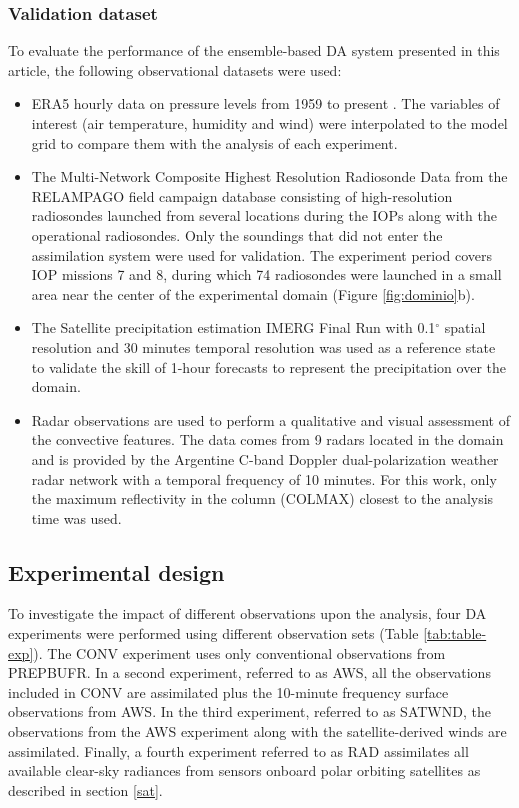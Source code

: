 \documentclass[final,5p,times,twocolumn,authoryear]{elsarticle} %
\begin{document}
\hypertarget{validation-dataset}{%
\subsubsection{Validation dataset}\label{validation-dataset}}

To evaluate the performance of the ensemble-based DA system presented in this article, the following observational datasets were used:

\begin{itemize}
\item
  ERA5 hourly data on pressure levels from 1959 to present \citep{era5pressure}. The variables of interest (air temperature, humidity and wind) were interpolated to the model grid to compare them with the analysis of each experiment.
\item
  The Multi-Network Composite Highest Resolution Radiosonde Data \citep{sondeos} from the RELAMPAGO field campaign database consisting of high-resolution radiosondes launched from several locations during the IOPs along with the operational radiosondes. Only the soundings that did not enter the assimilation system were used for validation. The experiment period covers IOP missions 7 and 8, during which 74 radiosondes were launched in a small area near the center of the experimental domain (Figure \ref{fig:dominio}b).
\item
  The Satellite precipitation estimation IMERG Final Run with 0.1\(^{\circ}\) spatial resolution and 30 minutes temporal resolution \citep{huffman2018} was used as a reference state to validate the skill of 1-hour forecasts to represent the precipitation over the domain.
\item
  Radar observations are used to perform a qualitative and visual assessment of the convective features. The data comes from 9 radars located in the domain and is provided by the Argentine C-band Doppler dual-polarization weather radar network \citep{deelia2017} with a temporal frequency of 10 minutes. For this work, only the maximum reflectivity in the column (COLMAX) closest to the analysis time was used.
\end{itemize}

\hypertarget{exp}{%
\subsection{Experimental design}\label{exp}}

To investigate the impact of different observations upon the analysis, four DA experiments were performed using different observation sets (Table \ref{tab:table-exp}). The CONV experiment uses only conventional observations from PREPBUFR. In a second experiment, referred to as AWS, all the observations included in CONV are assimilated plus the 10-minute frequency surface observations from AWS. In the third experiment, referred to as SATWND, the observations from the AWS experiment along with the satellite-derived winds are assimilated. Finally, a fourth experiment referred to as RAD assimilates all available clear-sky radiances from sensors onboard polar orbiting satellites as described in section \ref{sat}.
\end{document}
